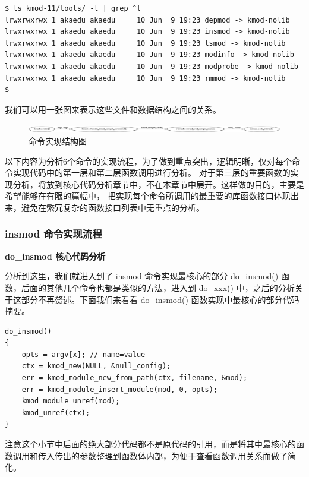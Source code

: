 \documentclass[11pt,a4paper]{article}
\makeatletter
\def\maxwidth{\ifdim\Gin@nat@width>\linewidth\linewidth
\else\Gin@nat@width\fi}
\let\Oldincludegraphics\includegraphics
\renewcommand{\includegraphics}[1]{\Oldincludegraphics[width=\maxwidth]{#1}}
\makeatother
\begin{document}
{\begin{shaded}\begin{verbatim}
$ ls kmod-11/tools/ -l | grep ^l
lrwxrwxrwx 1 akaedu akaedu     10 Jun  9 19:23 depmod -> kmod-nolib
lrwxrwxrwx 1 akaedu akaedu     10 Jun  9 19:23 insmod -> kmod-nolib
lrwxrwxrwx 1 akaedu akaedu     10 Jun  9 19:23 lsmod -> kmod-nolib
lrwxrwxrwx 1 akaedu akaedu     10 Jun  9 19:23 modinfo -> kmod-nolib
lrwxrwxrwx 1 akaedu akaedu     10 Jun  9 19:23 modprobe -> kmod-nolib
lrwxrwxrwx 1 akaedu akaedu     10 Jun  9 19:23 rmmod -> kmod-nolib
$ 
\end{verbatim}\end{shaded}}
我们可以用一张图来表示这些文件和数据结构之间的关系。

\begin{figure}[htbp]
\centering
\includegraphics{./figures/cmd.jpg}
\caption{命令实现结构图}
\end{figure}

以下内容为分析6个命令的实现流程，为了做到重点突出，逻辑明晰，仅对每个命令实现代码中的第一层和第二层函数调用进行分析。
对于第三层的重要函数的实现分析，将放到核心代码分析章节中，不在本章节中展开。这样做的目的，主要是希望能够在有限的篇幅中，
把实现每个命令所调用的最重要的库函数接口体现出来，避免在繁冗复杂的函数接口列表中无重点的分析。

\subsubsection{insmod 命令实现流程}

\textbf{do\_insmod 核心代码分析}

分析到这里，我们就进入到了 insmod 命令实现最核心的部分 do\_insmod()
函数，后面的其他几个命令也都是类似的方法，进入到 do\_xxx()
中，之后的分析关于这部分不再赘述。下面我们来看看 do\_insmod()
函数实现中最核心的部分代码摘要。

{\begin{shaded}\begin{verbatim}
do_insmod()
{
    opts = argv[x]; // name=value
    ctx = kmod_new(NULL, &null_config);
    err = kmod_module_new_from_path(ctx, filename, &mod);
    err = kmod_module_insert_module(mod, 0, opts);
    kmod_module_unref(mod);
    kmod_unref(ctx);
}
\end{verbatim}\end{shaded}}
注意这个小节中后面的绝大部分代码都不是原代码的引用，而是将其中最核心的函数调用和传入传出的参数整理到函数体内部，为便于查看函数调用关系而做了简化。
\end{document}
